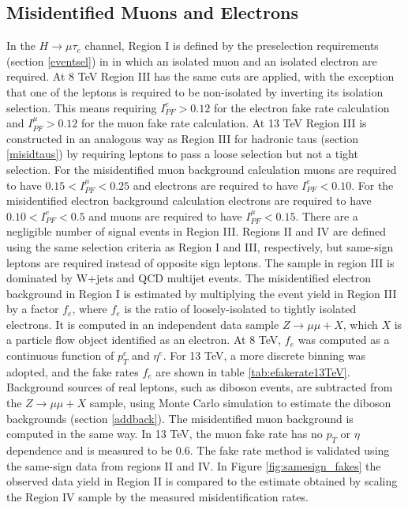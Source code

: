 \documentclass[oneside, letterpaper, oldfontcommands]{memoir}
\begin{document}
\subsection{Misidentified Muons and Electrons}
\qquad In the $H \rightarrow \mu\tau_{e}$ channel, Region I is defined by the preselection requirements (section \ref{eventsel}) in in which an isolated muon and an isolated electron are required. At 8 TeV Region III has the same cuts are applied, with the exception that one of the leptons is required to be non-isolated by inverting its isolation selection. This means requiring $I_{PF}^{e} > 0.12$ for the electron fake rate calculation and $I_{PF}^{\mu} > 0.12$ for the muon fake rate calculation. At 13 TeV Region III is constructed in an analogous way as Region III for hadronic taus (section \ref{misidtaus}) by requiring leptons to pass a loose selection but not a tight selection. For the misidentified muon background calculation muons are required to have $0.15 < I_{PF}^{\mu} < 0.25$ and electrons are required to have $I_{PF}^{e}<0.10$. For the misidentified electron background calculation electrons are required to have  $0.10 < I_{PF}^{e} < 0.5$ and muons are required to have $I_{PF}^{\mu} < 0.15$. There are a negligible number of signal events in Region III. Regions II and IV are defined using the same selection criteria as Region I and III, respectively, but same-sign leptons are required instead of opposite sign leptons. The sample in region III is dominated by W+jets and QCD multijet events. The misidentified electron background in Region I is estimated by multiplying the event yield in Region III by a factor $f_{e}$, where $f_{e}$ is the ratio of loosely-isolated to tightly isolated electrons. It is computed in an independent data sample $Z \rightarrow \mu\mu + X$, which $X$ is a particle flow object identified as an electron. At 8 TeV, $f_{e}$ was computed as a continuous function of $p_{T}^{e}$ and $\eta^{e}$. For 13 TeV, a more discrete binning was adopted, and the fake rates $f_{e}$ are shown in table \ref{tab:efakerate13TeV}. Background sources of real leptons, such as diboson events, are subtracted from the $Z \rightarrow \mu\mu +X$ sample, using Monte Carlo simulation to estimate the diboson backgrounds (section \ref{addback}). The misidentified muon background is computed in the same way. In 13 TeV, the muon fake rate has no $p_{T}$ or $\eta$ dependence and is measured to be 0.6. The fake rate method is validated using the same-sign data from regions II and IV. In Figure \ref{fig:samesign_fakes} the observed data yield in Region II is compared to the estimate obtained by scaling the Region IV sample by the measured misidentification rates.
\end{document}

